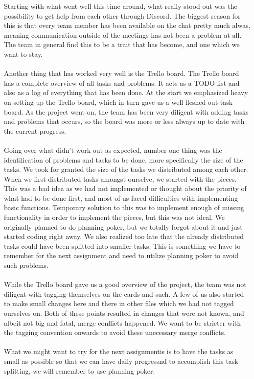 \documentclass{article}
\begin{document}
\maketitle
Starting with what went well this time around, what really stood out was the possibility to get help from each other through Discord. The biggest reason for this is that every team member has been available on the chat pretty much alwas, meaning communication outside of the meetings has not been a problem at all. The team in general find this to be a trait that has become, and one which we want to stay.\\\\
Another thing that has worked very well is the Trello board. The Trello board has a complete overview of all tasks and problems. It acts as a TODO list and also as a log of everything that has been done. At the start we emphasized heavy on setting up the Trello board, which in turn gave us a well fleshed out task board. As the project went on, the team has been very diligent with adding tasks and problems that occurs, so the board was more or less always up to date with the current progress.\\\\
Going over what didn't work out as expected, number one thing was the identification of problems and tasks to be done, more specifically the size of the tasks. We took for granted the size of the tasks we distributed among each other. When we first distributed tasks amongst ourselve, we started with the pieces. This was a bad idea as we had not implemented or thought about the priority of what had to be done first, and most of us faced difficulties with implementing basic functions. Temporary solution to this was to implement enough of missing functionality in order to implement the pieces, but this was not ideal. We originally planned to do planning poker, but we totally forgot about it and just started coding right away. We also realized too late that the already distributed tasks could have been splitted into smaller tasks. This is something we have to remember for the next assignment and need to utilize planning poker to avoid such problems.\\\\
While the Trello board gave us a good overview of the project, the team was not diligent with tagging themselves on the cards and such. A few of us also started to make small changes here and there in other files which we had not tagged ourselves on. Both of these points resulted in changes that were not known, and albeit not big and fatal, merge conflicts happened. We want to be stricter with the tagging convention onwards to avoid these unecessary merge conflicts.\\\\
What we might want to try for the next assignmentis is to have the tasks as small as possible so that we can have daily progressnd to accomplish this task splitting, we will remember to use planning poker.
\end{document}
